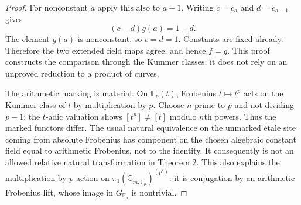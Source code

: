 \begin{proof}
For nonconstant $a$ apply this also to $a-1$. Writing $c=c_a$ and
$d=c_{a-1}$ gives
\[
       (c-d)g(a)=1-d.
\]
The element $g(a)$ is nonconstant, so $c=d=1$. Constants are fixed
already. Therefore the two extended field maps agree, and hence
$f=g$. This proof constructs the comparison through the Kummer
classes; it does not rely on an unproved reduction to a product of
curves.

The arithmetic marking is material. On $\mathbb F_p(t)$, Frobenius
$t\mapsto t^p$ acts on the Kummer class of $t$ by multiplication by
$p$. Choose $n$ prime to $p$ and not dividing $p-1$; the $t$-adic
valuation shows $[t^p]\ne[t]$ modulo $n$th powers. Thus the marked
functors differ. The usual natural equivalence on the unmarked
\'etale site coming from absolute Frobenius has component on the
chosen algebraic constant field equal to arithmetic Frobenius, not
to the identity. It consequently is not an allowed relative natural
transformation in Theorem 2. This also explains the multiplication-by-$p$
action on $\pi_1(\mathbb G_{m,\overline{\mathbb F}_p})^{(p')}$:
it is conjugation by an arithmetic Frobenius lift, whose image in
$G_{\mathbb F_p}$ is nontrivial.
\end{proof}
